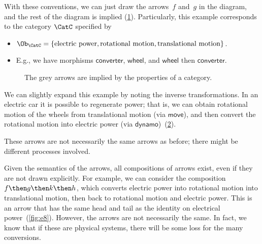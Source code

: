 With these conventions, we can just draw the arrows~$f$ and~$g$ in the diagram,
and the rest of the diagram is implied (\cref{fig:e5}). Particularly, this example corresponds to the category $\CatC$ specified by 
\begin{itemize}
    \item $\Ob_\CatC=\{\text{electric power},\text{rotational motion},\text{translational motion}\}$.
    \item E.g., we have morphisms $\mathsf{converter}$, $\mathsf{wheel}$, and $\mathsf{wheel}\text{ then }\mathsf{converter}$.
\end{itemize}

\begin{figure}[h!]
    \centering
    \caption{\label{fig:e5} The grey arrows are implied by the properties
    of a category.}
\end{figure}


We can slightly expand this example by noting the inverse transformations. In an electric car
it is possible to regenerate power; that is, we can obtain rotational motion of the wheels from
translational motion (via $\mathsf{move}$), and then convert the rotational motion into electric
power (via $\mathsf{dynamo}$)~(\cref{fig:e6}).


\begin{figure}[h!]
    \centering
    \caption{\label{fig:e6}}
\end{figure}

These arrows are not necessarily the same arrows as before; there might be different processes
involved.

\begin{figure}[h!]
    \centering
    \caption{\label{fig:e6-together}}
\end{figure}

Given the semantics of the arrows, all compositions of arrows exist, even if they are not drawn
explicitly. For example, we can consider the composition~$f\then g \then k \then h$, which
converts electric power into rotational motion into translational motion, then back to
rotational motion and electric power. This is an arrow that has the same head and tail as the
identity on electrical power~(\cref{fig:e8}). However, the arrows are not necessarily the same. In fact, we know that if these are physical systems, there will be some loss for the many conversions.

